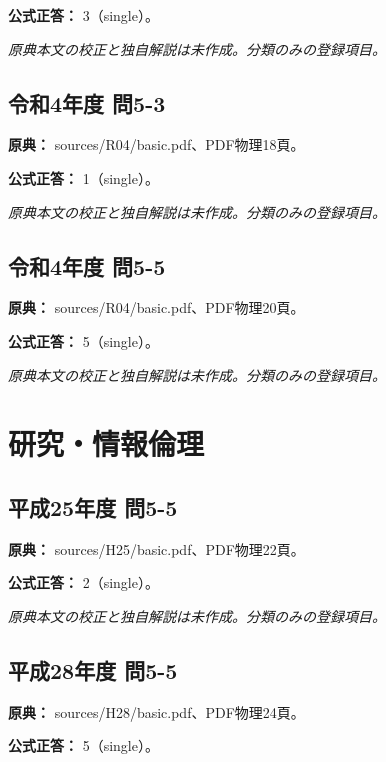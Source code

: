 \textbf{公式正答：} 3（single）。

\par\textit{原典本文の校正と独自解説は未作成。分類のみの登録項目。}

\subsection{令和4年度 問5-3}
\label{q:r04-reg-basic-5-3}

\noindent\textbf{原典：} sources/R04/basic.pdf、PDF物理18頁。

\textbf{公式正答：} 1（single）。

\par\textit{原典本文の校正と独自解説は未作成。分類のみの登録項目。}

\subsection{令和4年度 問5-5}
\label{q:r04-reg-basic-5-5}

\noindent\textbf{原典：} sources/R04/basic.pdf、PDF物理20頁。

\textbf{公式正答：} 5（single）。

\par\textit{原典本文の校正と独自解説は未作成。分類のみの登録項目。}

\section{研究・情報倫理}

\subsection{平成25年度 問5-5}
\label{q:h25-reg-basic-5-5}

\noindent\textbf{原典：} sources/H25/basic.pdf、PDF物理22頁。

\textbf{公式正答：} 2（single）。

\par\textit{原典本文の校正と独自解説は未作成。分類のみの登録項目。}

\subsection{平成28年度 問5-5}
\label{q:h28-reg-basic-5-5}

\noindent\textbf{原典：} sources/H28/basic.pdf、PDF物理24頁。

\textbf{公式正答：} 5（single）。

